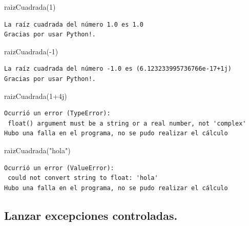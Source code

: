 \documentclass[
  spanish,
  letterpaper,
]{scrbook}
\newenvironment{Shaded}{\begin{snugshade}}{\end{snugshade}}
\newcommand{\DecValTok}[1]{\textcolor[rgb]{0.68,0.00,0.00}{#1}}
\newcommand{\NormalTok}[1]{\textcolor[rgb]{0.00,0.23,0.31}{#1}}
\newcommand{\OperatorTok}[1]{\textcolor[rgb]{0.37,0.37,0.37}{#1}}
\newcommand{\OtherTok}[1]{\textcolor[rgb]{0.00,0.23,0.31}{#1}}
\newcommand{\StringTok}[1]{\textcolor[rgb]{0.13,0.47,0.30}{#1}}
\theoremstyle{definition}
\theoremstyle{remark}
\begin{document}
\begin{Shaded}
\begin{Highlighting}[]
\NormalTok{raizCuadrada(}\DecValTok{1}\NormalTok{)}
\end{Highlighting}
\end{Shaded}

\begin{verbatim}
La raíz cuadrada del número 1.0 es 1.0
Gracias por usar Python!.
\end{verbatim}

\begin{Shaded}
\begin{Highlighting}[]
\NormalTok{raizCuadrada(}\OperatorTok{{-}}\DecValTok{1}\NormalTok{)}
\end{Highlighting}
\end{Shaded}

\begin{verbatim}
La raíz cuadrada del número -1.0 es (6.123233995736766e-17+1j)
Gracias por usar Python!.
\end{verbatim}

\begin{Shaded}
\begin{Highlighting}[]
\NormalTok{raizCuadrada(}\DecValTok{1}\OperatorTok{+}\OtherTok{4j}\NormalTok{)}
\end{Highlighting}
\end{Shaded}

\begin{verbatim}
Ocurrió un error (TypeError):
 float() argument must be a string or a real number, not 'complex'
Hubo una falla en el programa, no se pudo realizar el cálculo
\end{verbatim}

\begin{Shaded}
\begin{Highlighting}[]
\NormalTok{raizCuadrada(}\StringTok{"hola"}\NormalTok{)}
\end{Highlighting}
\end{Shaded}

\begin{verbatim}
Ocurrió un error (ValueError):
 could not convert string to float: 'hola'
Hubo una falla en el programa, no se pudo realizar el cálculo
\end{verbatim}

\subsection{Lanzar excepciones
controladas.}\label{lanzar-excepciones-controladas.}
\end{document}
